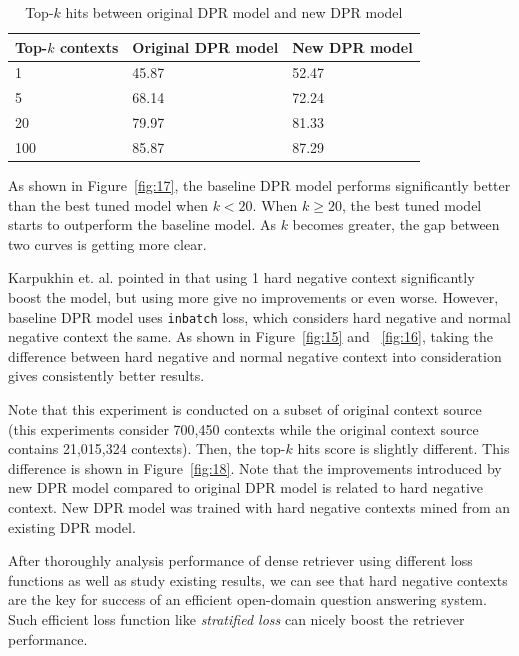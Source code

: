 \documentclass[12pt, sort&compress]{report}
\begin{document}
\begin{table}
	\caption{Top-$k$ hits between original DPR model and new DPR model}
	\label{tab:04}
	\centering
	\begin{tabular}{lll}
		\hline
		Top-$k$ contexts & Original DPR model & New DPR model \\\hline
		1 & 45.87 & 52.47 \\\hline
		5 & 68.14 & 72.24 \\\hline
		20 & 79.97 & 81.33 \\\hline
		100 & 85.87 & 87.29 \\\hline
	\end{tabular}
\end{table}
\par As shown in Figure~\ref{fig:17}, the baseline DPR model performs significantly better than the best tuned model when $k < 20$. When $k \geq 20$, the best tuned model starts to outperform the baseline model. As $k$ becomes greater, the gap between two curves is getting more clear.
\par Karpukhin et. al. pointed in \cite{karpukhin2020dense} that using 1 hard negative context significantly boost the model, but using more give no improvements or even worse. However, baseline DPR model uses {\tt inbatch} loss, which considers hard negative and normal negative context the same. As shown in Figure~\ref{fig:15} and ~\ref{fig:16}, taking the difference between hard negative and normal negative context into consideration gives consistently better results.
\par Note that this experiment is conducted on a subset of original context source (this experiments consider 700,450 contexts while the original context source contains 21,015,324 contexts). Then, the top-$k$ hits score is slightly different. This difference is shown in Figure~\ref{fig:18}. Note that the improvements introduced by new DPR model compared to original DPR model is related to hard negative context. New DPR model was trained with hard negative contexts mined from an existing DPR model.
\par After thoroughly analysis performance of dense retriever using different loss functions as well as study existing results, we can see that hard negative contexts are the key for success of an efficient open-domain question answering system. Such efficient loss function like \textit{stratified loss} can nicely boost the retriever performance.
\end{document}
